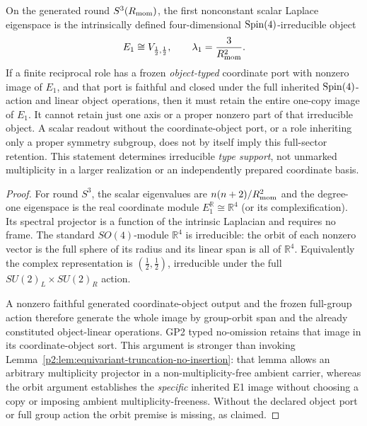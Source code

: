 \documentclass[12pt,a4paper]{article}
\begin{document}
\begin{theorem}
\label{p2:thm:intrinsic-coordinate-sector}
On the generated round \(S^3(R_{\mathrm{mom}})\), the first nonconstant scalar
Laplace eigenspace is the intrinsically defined four-dimensional
\(\mathrm{Spin}(4)\)-irreducible object
\[
 E_1\cong V_{\frac12,\frac12},\qquad
 \lambda_1=\frac3{R_{\mathrm{mom}}^2}.
\]
If a finite reciprocal role has a frozen \emph{object-typed} coordinate
port with nonzero image of \(E_1\), and that port is faithful and
closed under the full inherited \(\mathrm{Spin}(4)\)-action and linear
object operations, then it must retain the entire one-copy image of
\(E_1\).  It cannot retain just one axis or a proper nonzero part of
that irreducible object.  A scalar readout without the coordinate-object
port, or a role inheriting only a proper symmetry subgroup, does not by
itself imply this full-sector retention.  This statement determines
irreducible \emph{type support}, not unmarked multiplicity in a larger
realization or an independently prepared coordinate basis.
\end{theorem}
\begin{proof}
For round \(S^3\), the scalar eigenvalues are
\(n(n+2)/R_{\mathrm{mom}}^2\) and the degree-one eigenspace is the real
coordinate module \(E_1^{\mathbb R}\cong\mathbb R^4\) (or its
complexification).  Its spectral projector is a function of the
intrinsic Laplacian and requires no frame.  The standard
\(SO(4)\)-module \(\mathbb R^4\) is irreducible: the orbit of each
nonzero vector is the full sphere of its radius and its linear span is
all of \(\mathbb R^4\).  Equivalently the complex representation is
\((\frac12,\frac12)\), irreducible under the full
\(SU(2)_L\times SU(2)_R\) action.

A nonzero faithful generated coordinate-object output and the frozen
full-group action therefore generate the whole image by group-orbit
span and the already constituted object-linear operations.  GP2 typed
no-omission retains that image in its coordinate-object sort.  This
argument is stronger than invoking
Lemma~\ref{p2:lem:equivariant-truncation-no-insertion}: that lemma
allows an arbitrary multiplicity projector in a non-multiplicity-free
ambient carrier, whereas the orbit argument establishes the
\emph{specific} inherited E1 image without choosing a copy or
imposing ambient multiplicity-freeness.  Without the declared object
port or full group action the orbit premise is missing, as claimed.
\end{proof}
\end{document}
